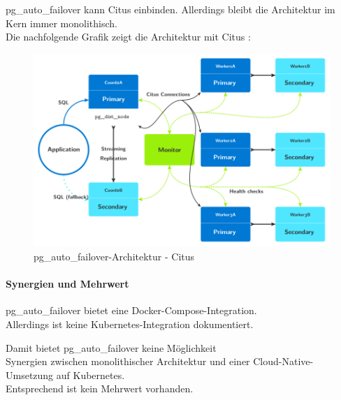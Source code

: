 \begin{flushleft}
    \clearpage
    pg\_auto\_failover kann Citus einbinden.
    Allerdings bleibt die Architektur im Kern immer monolithisch.\\
    Die nachfolgende Grafik zeigt die Architektur mit Citus \cite{3FVHLIFE}:
    \begin{figure}[H]
        \centering
        \includegraphics[width=0.75\linewidth]{source/implementation/evaluation/postgresql_ha_solutions/pg_auto_failover/pg_auto-failover_arch-citus}
        \caption{pg\_auto\_failover-Architektur - Citus}
        \label{fig:pg_auto-failover_arch-citus}
    \end{figure}
\end{flushleft}
\begin{flushleft}
    \paragraph{Synergien und Mehrwert}
    pg\_auto\_failover bietet eine Docker-Compose-Integration.\\
    Allerdings ist keine Kubernetes-Integration dokumentiert.
\end{flushleft}
\begin{flushleft}
    Damit bietet pg\_auto\_failover keine Möglichkeit\\
    Synergien zwischen monolithischer Architektur und einer Cloud-Native-Umsetzung auf Kubernetes.\\
    Entsprechend ist kein Mehrwert vorhanden.
\end{flushleft}